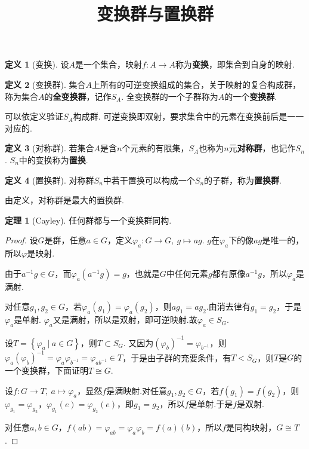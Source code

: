 \documentclass[12pt]{ctexart}
\title{\vspace{-2em}\textbf{变换群与置换群}\vspace{-2em}}
\date{ }
\theoremstyle{definition}
\newtheorem{definition}{定义}
\newtheorem{theorem}{定理}
\theoremstyle{plain}
\begin{document}
	\maketitle
	\begin{definition}[变换]
		设$A$是一个集合，映射$f:A\to A$称为\textbf{变换}，即集合到自身的映射.
	\end{definition}
	\begin{definition}[变换群]
		集合$A$上所有的可逆变换组成的集合，关于映射的复合构成群，称为集合$A$的\textbf{全变换群}，记作$S_A$. 全变换群的一个子群称为$A$的一个\textbf{变换群}.
	\end{definition}
	可以依定义验证$S_A$构成群. 可逆变换即双射，要求集合中的元素在变换前后是一一对应的.
	\begin{definition}[对称群]
		若集合$A$是含$n$个元素的有限集，$S_A$也称为$n$元\textbf{对称群}，也记作$S_n$. $S_n$中的变换称为\textbf{置换}.
	\end{definition}
	\begin{definition}[置换群]
		对称群$S_n$中若干置换可以构成一个$S_n$的子群，称为\textbf{置换群}.
	\end{definition}
	由定义，对称群是最大的置换群.
	\begin{theorem}[Cayley]
		任何群都与一个变换群同构.
	\end{theorem}
	\begin{proof}
		设$G$是群，任意$a\in G$，定义$\varphi_a:G\to G,\ g\mapsto ag$. $g$在$\varphi_a$下的像$ag$是唯一的，所以$\varphi$是映射.
		
		由于$a^{-1}g\in G$，而$\varphi_a(a^{-1}g)=g$，也就是$G$中任何元素$g$都有原像$a^{-1}g$，所以$\varphi_a$是满射.
		
		对任意$g_1,g_2\in G$，若$\varphi_a(g_1)=\varphi_a(g_2)$，则$ag_1=ag_2$.由消去律有$g_1=g_2$，于是$\varphi_a$是单射. $\varphi_a$又是满射，所以是双射，即可逆映射.故$\varphi_a\in S_G$.
		
		设$T=\left\{\varphi_a\ |\ a\in G\right\}$，则$T\subset S_G$. 又因为$(\varphi_b)^{-1}=\varphi_{b^{-1}}$，则$\varphi_a(\varphi_b)^{-1}=\varphi_a\varphi_{b^{-1}}=\varphi_{ab^{-1}}\in T$，于是由子群的充要条件，有$T<S_G$，则$T$是$G$的一个变换群，下面证明$T\cong G$.
		
		设$f:G\to T,\ a\mapsto\varphi_a$，显然$f$是满映射.对任意$g_1,g_2\in G$，若$f(g_1)=f(g_2)$，则$\varphi_{g_1}=\varphi_{g_2}$，$\varphi_{g_1}(e)=\varphi_{g_2}(e)$，即$g_1=g_2$，所以$f$是单射.于是$f$是双射.
		
		对任意$a,b\in G$，$f(ab)=\varphi_{ab}=\varphi_a\varphi_b=f(a)(b)$，所以$f$是同构映射，$G\cong T$.
	\end{proof}
\end{document}
